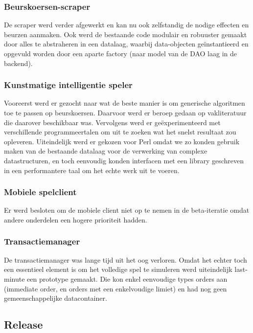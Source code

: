 \subsubsection{Beurskoersen-scraper}
De scraper werd verder afgewerkt en kan nu ook zelfstandig de nodige effecten en beurzen aanmaken. Ook werd de bestaande code modulair en robuuster gemaakt door alles te abstraheren in een datalaag, waarbij data-objecten ge\"instantieerd en opgevuld worden door een aparte factory (naar model van de DAO laag in de backend).

\subsubsection{Kunstmatige intelligentie speler}
Vooreerst werd er gezocht naar wat de beste manier is om generische algoritmen toe te passen op beurskoersen. Daarvoor werd er beroep gedaan op vakliteratuur die daarover beschikbaar was. Vervolgens werd er ge\"experimenteerd met verschillende programmeertalen om uit te zoeken wat het snelst resultaat zou opleveren. Uiteindelijk werd er gekozen voor Perl omdat we zo konden gebruik maken van de bestaande datalaag voor de verwerking van complexe datastructuren, en toch eenvoudig konden interfacen met een library geschreven in een performantere taal om het echte werk uit te voeren.

\subsubsection{Mobiele spelclient}
Er werd besloten om de mobiele client niet op te nemen in de beta-iteratie omdat andere onderdelen een hogere prioriteit hadden.

\subsubsection{Transactiemanager}
De transactiemanager was lange tijd uit het oog verloren. Omdat het echter toch een essentieel element is om het volledige spel te simuleren werd uiteindelijk last-minute een prototype gemaakt. Die kon enkel eenvoudige types orders aan (immediate order, en orders met een enkelvoudige limiet) en had nog geen gemeenschappelijke datacontainer.

\subsection{Release}

